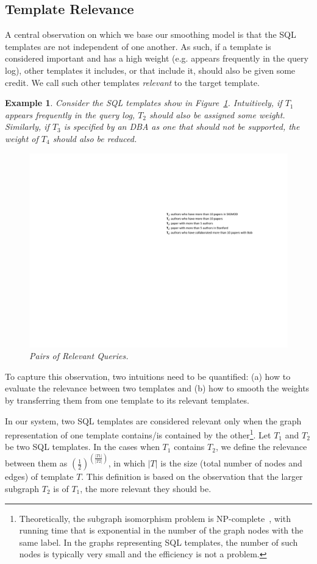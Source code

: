 \documentclass{vldb}
\newtheorem{example}{Example}
\begin{document}
\subsection{Template Relevance}
\label{subsec:model}

A central observation on which we base our smoothing model is that the SQL templates are not independent of one another.  As such, if a template is considered important and has a high weight (e.g. appears frequently in the query log), other templates it  includes, or that include it, should also be given some credit.  We call such other templates {\em relevant} to the target template.
\begin{example}
Consider the SQL templates show in Figure~\ref{fig:relevantQueries}.  Intuitively, if $T_1$ appears frequently in the query log, $T_2$ should also be assigned some weight.  Similarly, if $T_3$ is specified by an DBA as one that should not be supported, the weight of $T_4$ should also be reduced.  
\begin{figure}[h]
  \center
  \includegraphics[width=0.9\linewidth]{pic/SPJQuery2.pdf}
  \caption{Pairs of Relevant Queries.}
  \label{fig:relevantQueries}
\end{figure}
\end{example}

To capture this observation, two intuitions need to be quantified: (a) how to evaluate the relevance between two templates and (b) how to smooth the weights by transferring them from one template to its relevant templates.  

In our system, two SQL templates are considered relevant only when the graph representation of one template contains/is contained by the other\footnote{Theoretically, the subgraph isomorphism problem is NP-complete~\cite{DBLP:conf/stoc/Cook71}, with running time that is exponential in the number of the graph nodes with the same label.  In the graphs representing SQL templates, the number of such nodes is typically very small and the efficiency is not a problem. }.  Let $T_1$ and $T_2$ be two SQL templates.  In the cases when $T_1$ contains $T_2$, we define the relevance between them as $\mathit{(\frac{1}{2})^{(\frac{|T1|}{|T2|})}}$, in which $|T|$ is the size (total number of nodes and edges) of template $T$.  This definition is based on the observation that the larger subgraph $T_2$ is of $T_1$, the more relevant they should be.  
\end{document}
